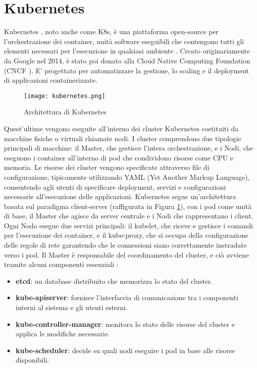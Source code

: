 \section{Kubernetes}
Kubernetes \cite{kubernetes}, noto anche come K8s, è una piattaforma open-source per l'orchestrazione dei container,
unità software eseguibili che contengono tutti gli elementi necessari per l'esecuzione in qualsiasi ambiente \cite{cont}.
Creato originariamente da Google nel 2014, è stato poi donato alla Cloud Native Computing Foundation (CNCF \cite{cncf}).
\newline E' progettato per automatizzare la gestione, lo scaling e il deployment di applicazioni containerizzate.
\begin{figure}[h]
    \centering
   \texttt{[image: kubernetes.png]}
    \caption{Architettura di Kubernetes \cite{kubeart}}
    \label{fig:kube}
\end{figure}
Quest'ultime vengono eseguite all'interno dei cluster Kubernetes costituiti da macchine fisiche o virtuali chiamate nodi. 
I cluster comprendono due tipologie principali di macchine: il Master, che gestisce l'intera orchestrazione, e i Nodi, che eseguono i container all'interno di pod che condividono risorse come CPU e memoria.
Le risorse dei cluster vengono specificate attraverso file di configurazione, tipicamente utilizzando YAML (Yet Another Markup Language), consentendo agli utenti di specificare deployment, servizi e configurazioni necessarie all'esecuzione delle applicazioni.
\newline Kubernetes segue un'architettura basata sul paradigma client-server (raffigurata in Figura \ref{fig:kube}), con i pod come unità di base, il Master che agisce da server centrale e i Nodi che rappresentano i client. 
Ogni Nodo esegue due servizi principali: il kubelet, che riceve e gestisce i comandi per l'esecuzione dei container, 
e il kube-proxy, che si occupa della configurazione delle regole di rete garantendo che le connessioni siano correttamente instradate verso i pod.
Il Master è responsabile del coordinamento del cluster, e ciò avviene tramite alcuni componenti essenziali \cite{kubeart}:
\begin{itemize}
    \item \textbf{etcd}: un database distribuito che memorizza lo stato del cluster.
    \item \textbf{kube-apiserver}: fornisce l'interfaccia di comunicazione tra i componenti interni al sistema e gli utenti esterni.
    \item \textbf{kube-controller-manager}: monitora lo stato delle risorse del cluster e applica le modifiche necessarie.
    \item \textbf{kube-scheduler}: decide su quali nodi eseguire i pod in base alle risorse disponibili.
\end{itemize}
